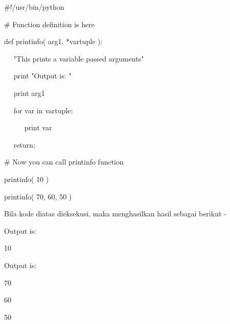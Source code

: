 \noindent 
 \hspace*{0.5in}  $  \#  $!/usr/bin/python \par
\vspace{12pt}
\noindent 
 \hspace*{0.5in}  $  \#  $ Function definition is here \par
\noindent 
 \hspace*{0.5in} def printinfo( arg1, *vartuple ): \par
\noindent 
 \hspace*{0.5in} ~~ "This prints a variable passed arguments" \par
\noindent 
 \hspace*{0.5in} ~~ print "Output is: " \par
\noindent 
 \hspace*{0.5in} ~~ print arg1 \par
\noindent 
 \hspace*{0.5in} ~~ for var in vartuple: \par
\noindent 
 \hspace*{0.5in} ~~~~~ print var \par
\noindent 
 \hspace*{0.5in} ~~ return; \par
\noindent 
 \hspace*{0.5in} \vspace{12pt}
\noindent 
 \hspace*{0.5in}  $  \#  $ Now you can call printinfo function \par
\noindent 
 \hspace*{0.5in} printinfo( 10 ) \par
\noindent 
 \hspace*{0.5in} printinfo( 70, 60, 50 ) \par
\noindent 
Bila kode diatas dieksekusi, maka menghasilkan hasil sebagai berikut - \par
\noindent 
 \hspace*{0.5in} Output is: \par
\noindent 
 \hspace*{0.5in} 10 \par
\noindent 
 \hspace*{0.5in} Output is: \par
\noindent 
 \hspace*{0.5in} 70 \par
\noindent 
 \hspace*{0.5in} 60 \par
\noindent 
 \hspace*{0.5in} 50 \par
